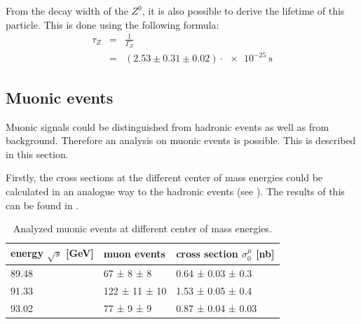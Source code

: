 \documentclass[epj,nopacs]{svjour}
\begin{document}
From the decay width of the $Z^0$, it is also possible to derive the lifetime
of this particle. This is done using the following formula:
\begin{eqnarray}
τ_Z &=& \frac{1}{Γ_Z}\\
\nonumber &=& (2.53 \pm 0.31 \pm 0.02) \cdot \SI{e-25}{\second}
\end{eqnarray}

\subsection{Muonic events}

Muonic signals could be distinguished from hadronic events as well as
from background. Therefore an analysis on muonic events is possible. This is
described in this section.

Firstly, the cross sections at the different center of mass energies could be
calculated in an analogue way to the hadronic events (see ). The
results of this can
be found in .

\begin{table}[h]
\begin{center}
\begin{tabular}{|l|l|l|}
\hline
energy $\sqrt{s}$ [\si{\GeV}] & muon events & cross section $σ_0^μ$ [\si{\nano\barn}]\\
\hline
89.48 & \phantom{0}67 ± \phantom{0}8 ± \phantom{0}8  & 0.64 ± 0.03 ± 0.3 \\
91.33 & 122 ± 11 ± 10 & 1.53 ± 0.05 ± 0.4 \\
93.02 & \phantom{0}77 ± \phantom{0}9 ± \phantom{0}9 & 0.87 ± 0.04 ± 0.03 \\
\hline
\end{tabular}
\vspace*{0.3cm}
\caption{\baselineskip=0.38cm Analyzed muonic events at different center of mass
energies.}
\label{tab:muon_events}
\end{center}
\vspace*{-0.5cm}
\end{table}
\end{document}

